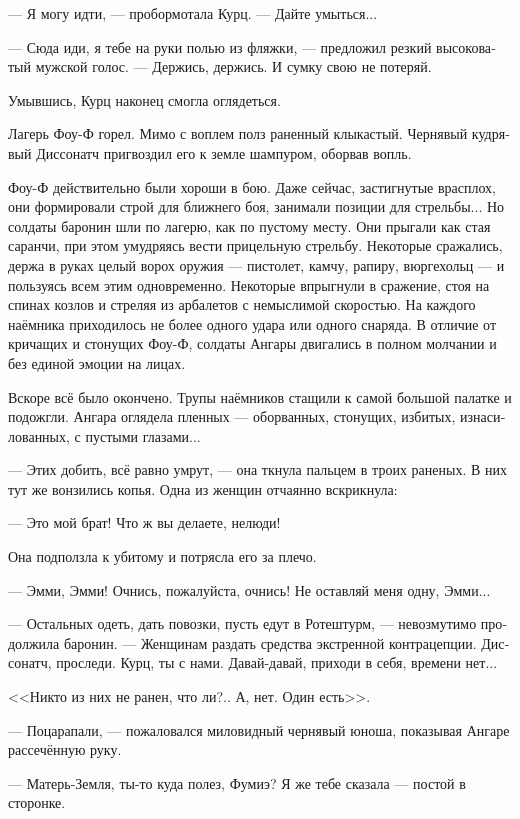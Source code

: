 \documentclass[a4paper,12pt,fleqn]{book}\usepackage{polyglossia}\setdefaultlanguage[babelshorthands=true]{russian}\setotherlanguage{english}\defaultfontfeatures{Ligatures=TeX,Mapping=tex-text}\usepackage{xcolor}\newcommand{\ml}[3]{#2}
\begin{document}
--- Я могу идти, --- пробормотала Курц.
--- Дайте умыться...

--- Сюда иди, я тебе на руки полью из фляжки, --- предложил резкий высоковатый мужской голос.
\ml{$0$}
{--- Держись, держись.}
{``Hold on, hold on.}
И сумку свою не потеряй.

Умывшись, Курц наконец смогла оглядеться.

Лагерь Фоу-Ф горел.
Мимо с воплем полз раненный клыкастый.
Чернявый кудрявый Диссонатч пригвоздил его к земле шампуром, оборвав вопль.

Фоу-Ф действительно были хороши в бою.
Даже сейчас, застигнутые врасплох, они формировали строй для ближнего боя, занимали позиции для стрельбы...
Но солдаты баронин шли по лагерю, как по пустому месту.
Они прыгали как стая саранчи, при этом умудряясь вести прицельную стрельбу.
Некоторые сражались, держа в руках целый ворох оружия --- пистолет, камчу, рапиру, вюргехольц --- и пользуясь всем этим одновременно.
Некоторые впрыгнули в сражение, стоя на спинах козлов и стреляя из арбалетов с немыслимой скоростью.
На каждого наёмника приходилось не более одного удара или одного снаряда.
В отличие от кричащих и стонущих Фоу-Ф, солдаты Ангары двигались в полном молчании и без единой эмоции на лицах.

Вскоре всё было окончено.
Трупы наёмников стащили к самой большой палатке и подожгли.
Ангара оглядела пленных --- оборванных, стонущих, избитых, изнасилованных, с пустыми глазами...

--- Этих добить, всё равно умрут, --- она ткнула пальцем в троих раненых.
В них тут же вонзились копья.
Одна из женщин отчаянно вскрикнула:

--- Это мой брат!
Что ж вы делаете, нелюди!

Она подползла к убитому и потрясла его за плечо.

--- Эмми, Эмми!
Очнись, пожалуйста, очнись!
Не оставляй меня одну, Эмми...

--- Остальных одеть, дать повозки, пусть едут в Ротештурм, --- невозмутимо продолжила баронин.
--- Женщинам раздать средства экстренной контрацепции.
Диссонатч, проследи.
Курц, ты с нами.
Давай-давай, приходи в себя, времени нет...

<<Никто из них не ранен, что ли?..
А, нет.
Один есть>>.

--- Поцарапали, --- пожаловался миловидный чернявый юноша, показывая Ангаре рассечённую руку.

--- Матерь-Земля, ты-то куда полез, Фумиэ?
Я же тебе сказала --- постой в сторонке.
\end{document}
